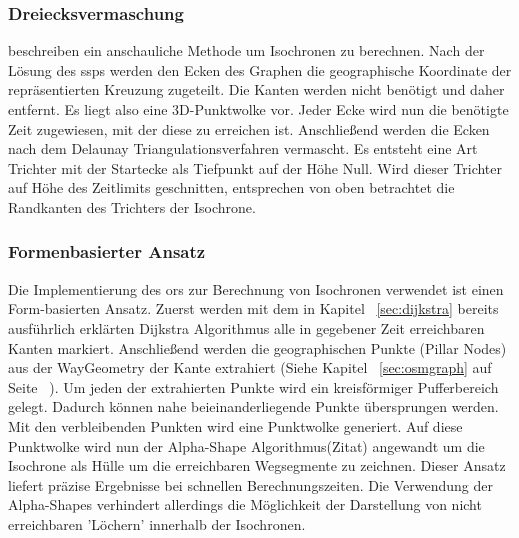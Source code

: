 \subsubsection{Dreiecksvermaschung}
\cite{isochrones} beschreiben ein anschauliche Methode um Isochronen zu berechnen.
Nach der Lösung des \gls{ssp}s werden den Ecken des Graphen die geographische Koordinate der repräsentierten Kreuzung zugeteilt.
Die Kanten werden nicht benötigt und daher entfernt.
Es liegt also eine 3D-Punktwolke vor.
Jeder Ecke wird nun die benötigte Zeit zugewiesen, mit der diese zu erreichen ist.
Anschließend werden die Ecken nach dem Delaunay Triangulationsverfahren vermascht.
Es entsteht eine Art Trichter mit der Startecke als Tiefpunkt auf der Höhe Null.
Wird dieser Trichter auf Höhe des Zeitlimits geschnitten, entsprechen von oben betrachtet die Randkanten des Trichters der Isochrone.


\subsubsection{Formenbasierter Ansatz}
Die Implementierung des \gls{ors} zur Berechnung von Isochronen verwendet ist einen Form-basierten Ansatz.
Zuerst werden mit dem in Kapitel ~\ref{sec:dijkstra} bereits ausführlich erklärten Dijkstra Algorithmus alle in gegebener Zeit erreichbaren Kanten markiert.
Anschließend werden die geographischen Punkte (Pillar Nodes) aus der WayGeometry der Kante extrahiert (Siehe Kapitel ~\ref{sec:osmgraph} auf Seite ~\pageref{sec:osmgraph}).
Um jeden der extrahierten Punkte wird ein kreisförmiger Pufferbereich gelegt.
Dadurch können nahe beieinanderliegende Punkte übersprungen werden.
Mit den verbleibenden Punkten wird eine Punktwolke generiert.
Auf diese Punktwolke wird nun der Alpha-Shape Algorithmus(Zitat) angewandt um die Isochrone als Hülle um die erreichbaren Wegsegmente zu zeichnen.
Dieser Ansatz liefert präzise Ergebnisse bei schnellen Berechnungszeiten.
Die Verwendung der Alpha-Shapes verhindert allerdings die Möglichkeit der Darstellung von nicht erreichbaren 'Löchern' innerhalb der Isochronen.
